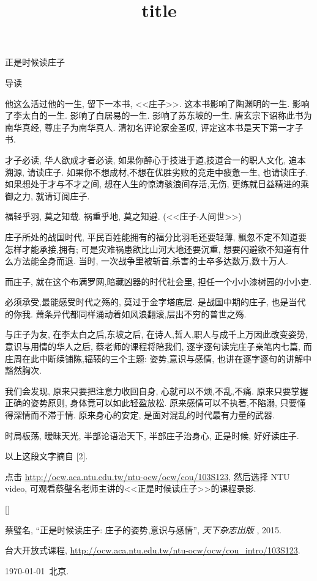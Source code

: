 \documentclass[11pt]{article}
\renewcommand{\cite}[1]{[#1]}
\def\beginrefs{\begin{list}%
		{[\arabic{equation}]}{\usecounter{equation}
			\setlength{\leftmargin}{0.8truecm}\setlength{\labelsep}{0.4truecm}%
			\setlength{\labelwidth}{1.6truecm}}}
\def\endrefs{\end{list}}
\def\bibentry#1{\item[\hbox{[#1]}]}
\begin{document}
\kaishu 
	
\setcounter{section}{-1}
\title{title}
\thispagestyle{empty}

\begin{center}
	{\Large \kaishu 正是时候读庄子}
	
	{\Large \kaishu 导读}
\end{center}

\vspace{-0.5cm}

他这么活过他的一生, 留下一本书, <<庄子>>. 这本书影响了陶渊明的一生. 影响了李太白的一生. 影响了白居易的一生. 影响了苏东坡的一生. 唐玄宗下诏称此书为南华真经, 尊庄子为南华真人. 清初名评论家金圣叹, 评定这本书是天下第一才子书.

才子必读, 华人欲成才者必读, 如果你醉心于技进于道,技道合一的职人文化, 追本溯源, 请读庄子. 如果你不想成材,不想在优胜劣败的竞走中疲惫一生, 也请读庄子. 如果想处于才与不才之间, 想在人生的惊涛骇浪间存活,无伤, 更练就日益精进的乘御之力, 就请订阅庄子.

福轻乎羽, 莫之知载. 祸重乎地, 莫之知避. (<<庄子$ \cdot $人间世>>)

庄子所处的战国时代, 平民百姓能拥有的福分比羽毛还要轻薄, 飘忽不定不知道要怎样才能承接,拥有; 可是灾难祸患欲比山河大地还要沉重, 想要闪避欲不知道有什么方法能全身而退. 当时, 一次战争里被斩首,杀害的士卒多达数万,数十万人.

而庄子, 就在这个布满罗网,暗藏凶器的时代社会里, 担任一个小小漆树园的小小吏.

必须承受,最能感受时代之殇的, 莫过于金字塔底层. 是战国中期的庄子, 也是当代的你我. 萧条异代都同样涌动着如风浪翻滚,层出不穷的普世之殇. 

与庄子为友, 在李太白之后,东坡之后, 在诗人,哲人,职人与成千上万因此改变姿势,意识与用情的华人之后, 蔡老师的课程将陪我们, 逐字逐句读完庄子亲笔内七篇, 而庄周在此中断续铺陈,辐辏的三个主题: 姿势,意识与感情, 也讲在逐字逐句的讲解中豁然胸次. 

我们会发现, 原来只要把注意力收回自身, 心就可以不烦,不乱,不痛. 原来只要掌握正确的姿势原则, 身体竟可以如此轻盈放松. 原来感情可以不执著,不陷溺, 只要懂得深情而不滞于情. 原来身心的安定, 是面对混乱的时代最有力量的武器.

时局板荡, 暧昧天光, 半部论语治天下, 半部庄子治身心, 正是时候, 好好读庄子. 


以上这段文字摘自 {\color{blue} \cite{2}}.


点击 \hspace{-0.25cm }\url{http://ocw.aca.ntu.edu.tw/ntu-ocw/ocw/cou/103S123}, 然后选择 NTU video, 可观看蔡璧名老师主讲的<<正是时候读庄子>>的课程录影.

\vspace{-0.5cm}

\beginrefs
\bibentry{1}{ 蔡璧名}, 
``正是时候读庄子: 庄子的姿势,意识与感情'',
{\it 天下杂志出版 },
2015.
\bibentry{2}{台大开放式课程}, \hspace{-0.25cm}
{ \url{http://ocw.aca.ntu.edu.tw/ntu-ocw/ocw/cou_intro/103S123}}.
\endrefs

\begin{flushright}
	\tiny \kaishu \today  \  北京.
\end{flushright}
\end{document}
